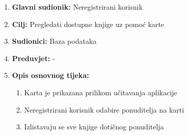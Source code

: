 \noindent {}
\begin{enumerate}
	
	\item \textbf{Glavni sudionik: }Neregistrirani korisnik
	\item  \textbf{Cilj:} Pregledati dostupne knjige uz pomoć karte
	\item  \textbf{Sudionici:} Baza podataka
	\item  \textbf{Preduvjet:} - 
	\item  \textbf{Opis osnovnog tijeka:}
	
	\begin{enumerate}
		
		\item Karta je prikazana prilikom učitavanja aplikacije
		\item Neregistrirani korisnik odabire ponuditelja na karti
		\item Izlistavaju se sve knjige dotičnog ponuditelja
		
	\end{enumerate}

\end{enumerate}


